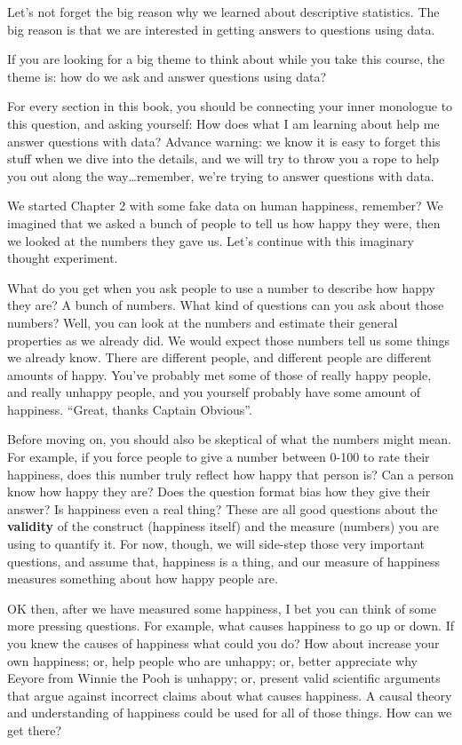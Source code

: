 \documentclass[
]{book}
\begin{document}
Let's not forget the big reason why we learned about descriptive statistics. The big reason is that we are interested in getting answers to questions using data.

If you are looking for a big theme to think about while you take this course, the theme is: how do we ask and answer questions using data?

For every section in this book, you should be connecting your inner monologue to this question, and asking yourself: How does what I am learning about help me answer questions with data? Advance warning: we know it is easy to forget this stuff when we dive into the details, and we will try to throw you a rope to help you out along the way\ldots remember, we're trying to answer questions with data.

We started Chapter 2 with some fake data on human happiness, remember? We imagined that we asked a bunch of people to tell us how happy they were, then we looked at the numbers they gave us. Let's continue with this imaginary thought experiment.

What do you get when you ask people to use a number to describe how happy they are? A bunch of numbers. What kind of questions can you ask about those numbers? Well, you can look at the numbers and estimate their general properties as we already did. We would expect those numbers tell us some things we already know. There are different people, and different people are different amounts of happy. You've probably met some of those of really happy people, and really unhappy people, and you yourself probably have some amount of happiness. ``Great, thanks Captain Obvious''.

Before moving on, you should also be skeptical of what the numbers might mean. For example, if you force people to give a number between 0-100 to rate their happiness, does this number truly reflect how happy that person is? Can a person know how happy they are? Does the question format bias how they give their answer? Is happiness even a real thing? These are all good questions about the \textbf{validity} of the construct (happiness itself) and the measure (numbers) you are using to quantify it. For now, though, we will side-step those very important questions, and assume that, happiness is a thing, and our measure of happiness measures something about how happy people are.

OK then, after we have measured some happiness, I bet you can think of some more pressing questions. For example, what causes happiness to go up or down. If you knew the causes of happiness what could you do? How about increase your own happiness; or, help people who are unhappy; or, better appreciate why Eeyore from Winnie the Pooh is unhappy; or, present valid scientific arguments that argue against incorrect claims about what causes happiness. A causal theory and understanding of happiness could be used for all of those things. How can we get there?
\end{document}
